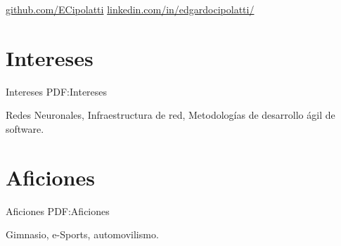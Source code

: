 \documentclass[letterpaper,MMMyyyy,nonstop]{simpleresumecv}
\begin{document}
\begin{body}
\BulletItem
\href{https://github.com/ECipolatti}{github.com/ECipolatti}
\BulletItem
\href{https://www.linkedin.com/in/edgardocipolatti/}{linkedin.com/in/edgardocipolatti/}


\section
{Intereses}
{Intereses}
{PDF:Intereses}

Redes Neuronales, Infraestructura de red, Metodologías de desarrollo ágil de software.


\section
{Aficiones}
{Aficiones}
{PDF:Aficiones}

Gimnasio, e-Sports, automovilismo.


\end{body}
\end{document}
